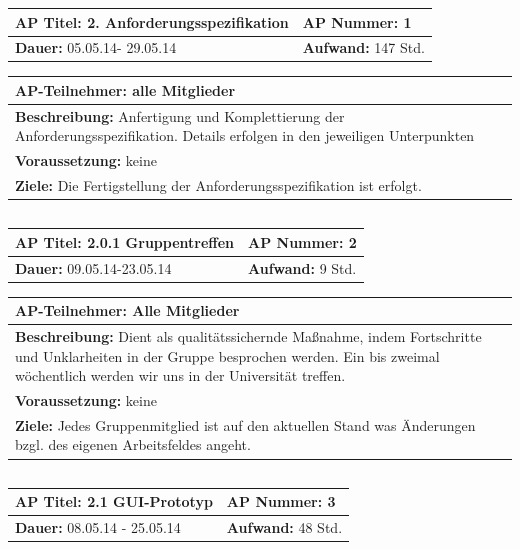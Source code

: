 \documentclass[fontsize=12pt,paper=a4,twoside]{scrartcl}
\begin{document}
\begin{tabular}{|p{7.43cm}|p{7.43cm}|}
\hline
\textbf{AP Titel: }2. Anforderungsspezifikation & \textbf{AP Nummer:} 1 \\ 
\hline
\textbf{Dauer: } 05.05.14- 29.05.14 & \textbf{Aufwand: }147 Std.\\
\hline
\end{tabular}
\begin{tabular}{|p{15.3cm}|}
\hline
\textbf{AP-Teilnehmer: } alle Mitglieder\\
\hline
\textbf{Beschreibung: }Anfertigung und Komplettierung der Anforderungsspezifikation. Details erfolgen in den jeweiligen Unterpunkten\\
\hline
\textbf{Voraussetzung: }keine \\
\hline 
\textbf{Ziele: }Die Fertigstellung der Anforderungsspezifikation ist erfolgt.\\
\hline 
\end{tabular}
\begin{verbatim}

\end{verbatim}
\begin{tabular}{|p{7.43cm}|p{7.43cm}|}
\hline
\textbf{AP Titel: } 2.0.1 Gruppentreffen & \textbf{AP Nummer:} 2 \\ 
\hline
\textbf{Dauer: }09.05.14-23.05.14 & \textbf{Aufwand: }9 Std.\\
\hline
\end{tabular}
\begin{tabular}{|p{15.3cm}|}
\hline
\textbf{AP-Teilnehmer: } Alle Mitglieder\\
\hline
\textbf{Beschreibung: }Dient als qualitätssichernde Maßnahme,
indem Fortschritte und Unklarheiten in der Gruppe besprochen werden.
Ein bis zweimal wöchentlich werden wir uns in der Universität treffen.\\
\hline
\textbf{Voraussetzung: }keine\\
\hline 
\textbf{Ziele: }Jedes Gruppenmitglied ist auf den aktuellen Stand was Änderungen bzgl. des eigenen Arbeitsfeldes angeht.\\
\hline 
\end{tabular}
\begin{verbatim}

\end{verbatim}
\begin{tabular}{|p{7.43cm}|p{7.43cm}|}
\hline
\textbf{AP Titel: }2.1 GUI-Prototyp & \textbf{AP Nummer: }3 \\ 
\hline
\textbf{Dauer: }08.05.14 - 25.05.14 & \textbf{Aufwand: }48 Std.\\
\hline
\end{tabular}
\end{document}
